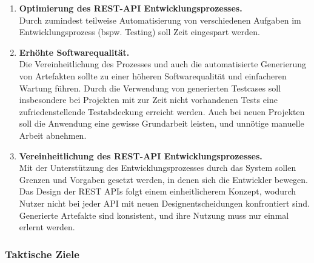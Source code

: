 \begin{enumerate}
	\item \textbf{Optimierung des REST-API Entwicklungsprozesses.} \\
	Durch zumindest teilweise Automatisierung von verschiedenen Aufgaben im Entwicklungsprozess (bspw. Testing) soll Zeit eingespart werden.
	\item \textbf{Erhöhte Softwarequalität.} \\
	Die Vereinheitlichung des Prozesses und auch die automatisierte Generierung von Artefakten sollte zu einer höheren Softwarequalität und einfacheren Wartung führen. Durch die Verwendung von generierten Testcases soll insbesondere bei Projekten mit zur Zeit nicht vorhandenen Tests eine zufriedenstellende Testabdeckung erreicht werden. Auch bei neuen Projekten soll die Anwendung eine gewisse Grundarbeit leisten, und unnötige manuelle Arbeit abnehmen.
	\item \textbf{Vereinheitlichung des REST-API Entwicklungsprozesses.} \\
	Mit der Unterstützung des Entwicklungsprozesses durch das System sollen Grenzen und Vorgaben gesetzt werden, in denen sich die Entwickler bewegen. Das Design der REST APIs folgt einem einheitlicherem Konzept, wodurch Nutzer nicht bei jeder API mit neuen Designentscheidungen konfrontiert sind. Generierte Artefakte sind konsistent, und ihre Nutzung muss nur einmal erlernt werden.	
\end{enumerate}


\subsubsection{Taktische Ziele}

